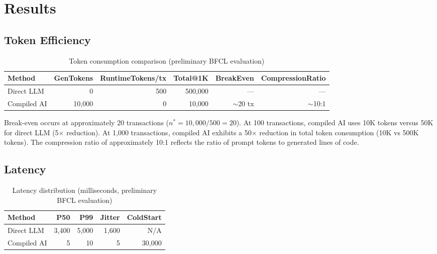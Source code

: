\documentclass[11pt]{article}
\begin{document}
\section{Results}
\label{sec:results}

\subsection{Token Efficiency}

\begin{table}[ht]
\centering
\caption{Token consumption comparison (preliminary BFCL evaluation)}
\label{tab:token-results}
\begin{tabular}{lrrrrr}
\toprule
Method & GenTokens & RuntimeTokens/tx & Total@1K & BreakEven & CompressionRatio \\
\midrule
Direct LLM & 0 & 500 & 500,000 & --- & --- \\
Compiled AI & 10,000 & 0 & 10,000 & $\sim$20 tx & $\sim$10:1 \\
\bottomrule
\end{tabular}
\end{table}

Break-even occurs at approximately 20 transactions ($n^* = 10{,}000 / 500 = 20$). At 100 transactions, compiled AI uses 10K tokens versus 50K for direct LLM (5$\times$ reduction). At 1,000 transactions, compiled AI exhibits a 50$\times$ reduction in total token consumption (10K vs 500K tokens). The compression ratio of approximately 10:1 reflects the ratio of prompt tokens to generated lines of code.

\subsection{Latency}

\begin{table}[ht]
\centering
\caption{Latency distribution (milliseconds, preliminary BFCL evaluation)}
\label{tab:latency-results}
\begin{tabular}{lrrrr}
\toprule
Method & P50 & P99 & Jitter & ColdStart \\
\midrule
Direct LLM & 3,400 & 5,000 & 1,600 & N/A \\
Compiled AI & 5 & 10 & 5 & 30,000 \\
\bottomrule
\end{tabular}
\end{table}
\end{document}
